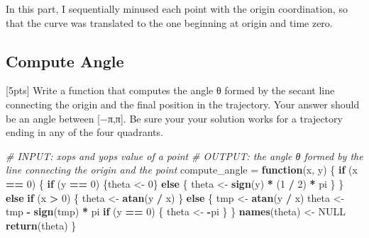 \documentclass[]{article}
\newenvironment{Shaded}{\begin{snugshade}}{\end{snugshade}}
\newcommand{\CommentTok}[1]{\textcolor[rgb]{0.56,0.35,0.01}{\textit{#1}}}
\newcommand{\ControlFlowTok}[1]{\textcolor[rgb]{0.13,0.29,0.53}{\textbf{#1}}}
\newcommand{\DecValTok}[1]{\textcolor[rgb]{0.00,0.00,0.81}{#1}}
\newcommand{\KeywordTok}[1]{\textcolor[rgb]{0.13,0.29,0.53}{\textbf{#1}}}
\newcommand{\NormalTok}[1]{#1}
\newcommand{\OperatorTok}[1]{\textcolor[rgb]{0.81,0.36,0.00}{\textbf{#1}}}
\newcommand{\OtherTok}[1]{\textcolor[rgb]{0.56,0.35,0.01}{#1}}
\newcommand{\StringTok}[1]{\textcolor[rgb]{0.31,0.60,0.02}{#1}}
\begin{document}
In this part, I sequentially minused each point with the origin
coordination, so that the curve was translated to the one beginning at
origin and time zero.

\hypertarget{compute-angle}{%
\subsection{Compute Angle}\label{compute-angle}}

{[}5pts{]} Write a function that computes the angle θ formed by the
secant line connecting the origin and the final position in the
trajectory. Your answer should be an angle between {[}−π,π{]}. Be sure
your your solution works for a trajectory ending in any of the four
quadrants.

\begin{Shaded}
\begin{Highlighting}[]
\CommentTok{# INPUT: xops and yops value of a point}
\CommentTok{# OUTPUT: the angle θ formed by the line connecting the origin and the point}
\NormalTok{compute_angle =}\StringTok{ }\ControlFlowTok{function}\NormalTok{(x, y) \{}
  \ControlFlowTok{if}\NormalTok{ (x }\OperatorTok{==}\StringTok{ }\DecValTok{0}\NormalTok{) \{}
    \ControlFlowTok{if}\NormalTok{ (y }\OperatorTok{==}\StringTok{ }\DecValTok{0}\NormalTok{) \{theta <-}\StringTok{ }\DecValTok{0}\NormalTok{\}}
    \ControlFlowTok{else}\NormalTok{ \{}
\NormalTok{      theta <-}\StringTok{ }\KeywordTok{sign}\NormalTok{(y) }\OperatorTok{*}\StringTok{ }\NormalTok{(}\DecValTok{1} \OperatorTok{/}\StringTok{ }\DecValTok{2}\NormalTok{) }\OperatorTok{*}\StringTok{ }\NormalTok{pi}
\NormalTok{    \}}
\NormalTok{  \}}
  \ControlFlowTok{else} \ControlFlowTok{if}\NormalTok{ (x }\OperatorTok{>}\StringTok{ }\DecValTok{0}\NormalTok{) \{ }
\NormalTok{    theta <-}\StringTok{ }\KeywordTok{atan}\NormalTok{(y }\OperatorTok{/}\StringTok{ }\NormalTok{x)}
\NormalTok{  \}}
  \ControlFlowTok{else}\NormalTok{ \{}
\NormalTok{    tmp <-}\StringTok{ }\KeywordTok{atan}\NormalTok{(y }\OperatorTok{/}\StringTok{ }\NormalTok{x)}
\NormalTok{    theta <-}\StringTok{ }\NormalTok{tmp }\OperatorTok{-}\StringTok{ }\KeywordTok{sign}\NormalTok{(tmp) }\OperatorTok{*}\StringTok{ }\NormalTok{pi}
    \ControlFlowTok{if}\NormalTok{ (y }\OperatorTok{==}\StringTok{ }\DecValTok{0}\NormalTok{) \{}
\NormalTok{      theta <-}\StringTok{ }\OperatorTok{-}\NormalTok{pi}
\NormalTok{    \}}
\NormalTok{  \}}
  \KeywordTok{names}\NormalTok{(theta) <-}\StringTok{ }\OtherTok{NULL}
  \KeywordTok{return}\NormalTok{(theta)}
\NormalTok{\}}


\end{Highlighting}
\end{Shaded}
\end{document}
